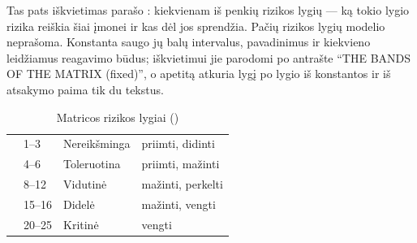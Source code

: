 Tas pats iškvietimas parašo : kiekvienam iš penkių rizikos lygių --- ką
tokio lygio rizika reiškia šiai įmonei ir kas dėl jos sprendžia. Pačių rizikos lygių modelio
neprašoma. Konstanta  saugo jų balų intervalus, pavadinimus ir kiekvieno leidžiamus
reagavimo būdus; iškvietimui jie parodomi po antrašte
\enquote{THE BANDS OF THE MATRIX (fixed)}, o  apetitą atkuria lygį po lygio iš
konstantos ir iš atsakymo paima tik du tekstus.

\begin{table}[H]
\caption{Matricos rizikos lygiai ()}\label{tab:programme:bands}
\begin{tabularx}{\textwidth}{@{}L{24mm}L{16mm}L{44mm}Y@{}}
\toprule
{} &  &  &  \\
\midrule
{} & 1--3 & Nereikšminga & priimti, didinti \\
 & 4--6 & Toleruotina & priimti, mažinti \\
 & 8--12 & Vidutinė & mažinti, perkelti \\
 & 15--16 & Didelė & mažinti, vengti \\
 & 20--25 & Kritinė & vengti \\
\bottomrule
\end{tabularx}
\end{table}

